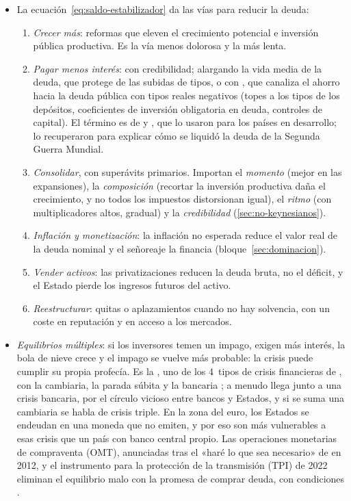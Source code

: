 \documentclass[11pt]{article}
\begin{document}
\begin{itemize}
\item La ecuación~\eqref{eq:saldo-estabilizador} da las vías para reducir la deuda:
  \begin{enumerate}
  \item \emph{Crecer más}: reformas que eleven el crecimiento potencial e inversión pública productiva. Es la vía menos dolorosa y la más lenta.
  \item \emph{Pagar menos interés}: con credibilidad; alargando la vida media de la deuda, que protege de las subidas de tipos, o con , que canaliza el ahorro hacia la deuda pública con tipos reales negativos (topes a los tipos de los depósitos, coeficientes de inversión obligatoria en deuda, controles de capital). El término es de \textcite{McKinnon1973Money} y \textcite{Shaw1973Financial}, que lo usaron para los países en desarrollo; \textcite{ReinhartSbrancia2015Liquidation} lo recuperaron para explicar cómo se liquidó la deuda de la Segunda Guerra Mundial.
  \item \emph{Consolidar}, con superávits primarios. Importan el \emph{momento} (mejor en las expansiones), la \emph{composición} (recortar la inversión productiva daña el crecimiento, y no todos los impuestos distorsionan igual), el \emph{ritmo} (con multiplicadores altos, gradual) y la \emph{credibilidad} (\ref{sec:no-keynesianos}).
  \item \emph{Inflación y monetización}: la inflación no esperada reduce el valor real de la deuda nominal y el señoreaje la financia (bloque~\ref{sec:dominacion}).
  \item \emph{Vender activos}: las privatizaciones reducen la deuda bruta, no el déficit, y el Estado pierde los ingresos futuros del activo.
  \item \emph{Reestructurar}: quitas o aplazamientos cuando no hay solvencia, con un coste en reputación y en acceso a los mercados.
  \end{enumerate}
\item \emph{Equilibrios múltiples}: si los inversores temen un impago, exigen más interés, la bola de nieve crece y el impago se vuelve más probable: la crisis puede cumplir su propia profecía\nocite{Calvo1988Servicing}. Es la , uno de los 4~tipos de crisis financieras de \textcite{ClaessensKose2013Financial}, con la cambiaria, la parada súbita y la bancaria  ; a menudo llega junto a una crisis bancaria, por el círculo vicioso entre bancos y Estados, y si se suma una cambiaria se habla de crisis triple. En la zona del euro, los Estados se endeudan en una moneda que no emiten, y por eso son más vulnerables a esas crisis que un país con banco central propio\nocite{DeGrauwe2011Governance}. Las operaciones monetarias de compraventa (OMT), anunciadas tras el «haré lo que sea necesario» de  en 2012, y el instrumento para la protección de la transmisión (TPI) de 2022 eliminan el equilibrio malo con la promesa de comprar deuda, con condiciones\nocite{Draghi2012Speech,BCE2012OMT,BCE2022TPI}  .

\end{itemize}
\end{document}

